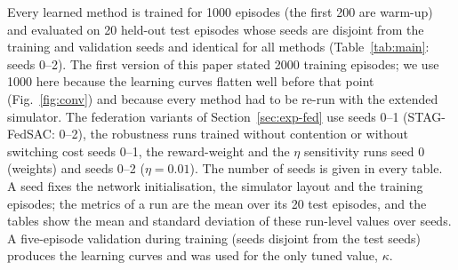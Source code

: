 Every learned method is trained for 1000 episodes (the first 200 are warm-up) and evaluated on 20 held-out test episodes whose seeds are disjoint from the training and validation seeds and identical for all methods (Table~\ref{tab:main}: seeds 0--2). The first version of this paper stated 2000 training episodes; we use 1000 here because the learning curves flatten well before that point (Fig.~\ref{fig:conv}) and because every method had to be re-run with the extended simulator. The federation variants of Section~\ref{sec:exp-fed} use seeds 0--1 (STAG-FedSAC: 0--2), the robustness runs trained without contention or without switching cost seeds 0--1, the reward-weight and the $\eta$ sensitivity runs seed 0 (weights) and seeds 0--2 ($\eta=0.01$). The number of seeds is given in every table. A seed fixes the network initialisation, the simulator layout and the training episodes; the metrics of a run are the mean over its 20 test episodes, and the tables show the mean and standard deviation of these run-level values over seeds. A five-episode validation during training (seeds disjoint from the test seeds) produces the learning curves and was used for the only tuned value, $\kappa$.
